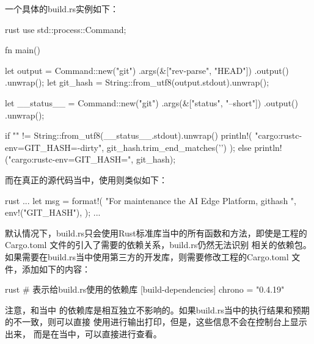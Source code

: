 一个具体的build.rs实例如下：
\begin{code-block}{rust}
use std::process::Command;

fn main() {
    let output = Command::new("git")
        .args(&["rev-parse", "HEAD"])
        .output()
        .unwrap();
    let git_hash = String::from_utf8(output.stdout).unwrap();

    let __status__ = Command::new("git")
        .args(&["status", "--short"])
        .output()
        .unwrap();

    if "" != String::from_utf8(__status__.stdout).unwrap() {
        println!(
            "cargo:rustc-env=GIT_HASH={}-dirty",
            git_hash.trim_end_matches('\n')
        );
    } else {
        println!("cargo:rustc-env=GIT_HASH={}", git_hash);
    }
}
\end{code-block}

而在真正的源代码当中，使用则类似如下：
\begin{code-block}{rust}
...
let msg = format!(
    "For maintenance the AI Edge Platform, \nbuilt githash {}",
    env!("GIT_HASH"),
);
...
\end{code-block}

默认情况下，build.rs只会使用Rust标准库当中的所有函数和方法，即使是工程的Cargo.toml
文件的引入了需要的依赖关系，build.rs仍然无法识别
相关的依赖包。如果需要在build.rs当中使用第三方的开发库，则需要修改工程的Cargo.toml
文件，添加如下的内容：
\begin{code-block}{rust}
# 表示给build.rs使用的依赖库
[build-dependencies]
chrono = "0.4.19"
\end{code-block}

注意，和当中
的依赖库是相互独立不影响的。如果build.rs当中的执行结果和预期的不一致，则可以直接
使用进行输出打印，但是，这些信息不会在控制台上显示出来，
而是在当中，可以直接进行查看。

